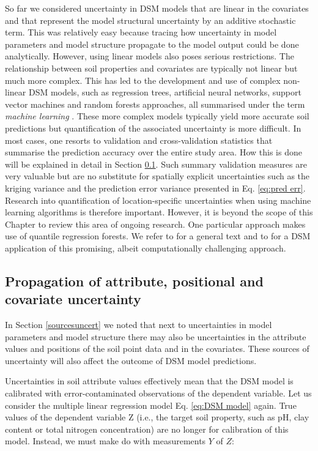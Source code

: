 \documentclass[10pt,b5paper,]{book}
\theoremstyle{definition}
\theoremstyle{definition}
\theoremstyle{definition}
\theoremstyle{remark}
\begin{document}
So far we considered uncertainty in DSM models that are linear in the
covariates and that represent the model structural uncertainty by an
additive stochastic term. This was relatively easy because tracing how
uncertainty in model parameters and model structure propagate to the
model output could be done analytically. However, using linear models
also poses serious restrictions. The relationship between soil
properties and covariates are typically not linear but much more
complex. This has led to the development and use of complex non-linear
DSM models, such as regression trees, artificial neural networks,
support vector machines and random forests approaches, all summarised
under the term \emph{machine learning}
\citep[e.g.,][]{hengl2015mapping}. These more complex models typically
yield more accurate soil predictions but quantification of the
associated uncertainty is more difficult. In most cases, one resorts to
validation and cross-validation statistics that summarise the prediction
accuracy over the entire study area. How this is done will be explained
in detail in Section \ref{propUncertainty}. Such summary validation
measures are very valuable but are no substitute for spatially explicit
uncertainties such as the kriging variance and the prediction error
variance presented in Eq. \ref{eq:pred err}. Research into
quantification of location-specific uncertainties when using machine
learning algorithms is therefore important. However, it is beyond the
scope of this Chapter to review this area of ongoing research. One
particular approach makes use of quantile regression forests. We refer
to \cite{meinshausen2006quantile} for a general text and to
\cite{vaysse2017using} for a DSM application of this promising, albeit
computationally challenging approach.

\hypertarget{propUncertainty}{%
\subsection{Propagation of attribute, positional and covariate
uncertainty}\label{propUncertainty}}

In Section \ref{sourcesuncert} we noted that next to uncertainties in
model parameters and model structure there may also be uncertainties in
the attribute values and positions of the soil point data and in the
covariates. These sources of uncertainty will also affect the outcome of
DSM model predictions.

Uncertainties in soil attribute values effectively mean that the DSM
model is calibrated with error-contaminated observations of the
dependent variable. Let us consider the multiple linear regression model
Eq. \ref{eq:DSM model} again. True values of the dependent variable Z
(i.e., the target soil property, such as pH, clay content or total
nitrogen concentration) are no longer for calibration of this model.
Instead, we must make do with measurements \(Y\) of \(Z\):
\end{document}
